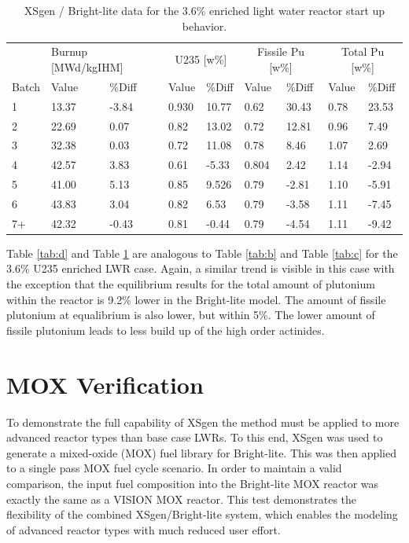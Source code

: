 \documentclass{article}
\begin{document}
\begin{table}[!htb]
\centering
\caption{XSgen / Bright-lite data for the 3.6\% enriched light water reactor start up behavior.}
\label{tab:e}
\begin{tabular}{l | ll | ll | ll | ll}
 & \multicolumn{2}{p{1cm}}{Burnup [MWd/kgIHM]} & \multicolumn{2}{c}{U235 [w\%]} & \multicolumn{2}{c}{Fissile Pu [w\%]} & \multicolumn{2}{c}{Total Pu [w\%]} \\
Batch & Value & \%Diff & Value & \%Diff & Value & \%Diff & Value & \%Diff \\
\hline
1 & 13.37 & -3.84 & 0.930 & 10.77 & 0.62 & 30.43 & 0.78 & 23.53 \\
2 & 22.69 & 0.07 & 0.82 & 13.02 & 0.72 & 12.81 & 0.96 & 7.49 \\
3 & 32.38 & 0.03 & 0.72 & 11.08 & 0.78 & 8.46 & 1.07 & 2.69 \\
4 & 42.57 & 3.83 & 0.61 & -5.33 & 0.804 & 2.42 & 1.14 & -2.94 \\
5 & 41.00 & 5.13 & 0.85 & 9.526 & 0.79 & -2.81 & 1.10 & -5.91 \\
6 & 43.83 & 3.04 & 0.82 & 6.53 & 0.79 & -3.58 & 1.11 & -7.45 \\
7+ & 42.32 & -0.43 & 0.81 & -0.44 & 0.79 & -4.54 & 1.11 & -9.42
\end{tabular}
\end{table}

Table \ref{tab:d} and Table \ref{tab:e} are analogous to Table \ref{tab:b} and Table \ref{tab:c}
for the 3.6\% U235 enriched LWR case. Again, a similar trend is visible in this case with the
exception that the equilibrium results for the total amount of plutonium within the
reactor is 9.2\% lower in the Bright-lite model. The amount of fissile plutonium at equalibrium is also lower,
but within 5\%. The lower amount of fissile plutonium leads
to less build up of the high order actinides.

\section{MOX Verification}
\label{sec-mox-benchmark}
To demonstrate the full capability of XSgen the method must be applied to more advanced
reactor types than base case LWRs. To this end, XSgen was used to generate a mixed-oxide (MOX)
fuel library for Bright-lite. This was then applied to a single pass MOX fuel cycle scenario.
In order to maintain a valid comparison, the input fuel composition into the Bright-lite MOX
reactor was exactly the same as a VISION MOX reactor.
This test demonstrates the flexibility of the combined XSgen/Bright-lite system, which enables
the modeling of advanced reactor types with much reduced user effort.
\end{document}
